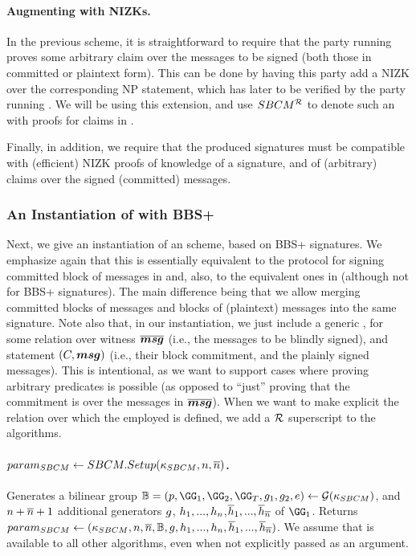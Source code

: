 \paragraph{Augmenting with NIZKs.} %
In the previous \SBCM scheme, it is straightforward to require that the party
running \SBCMCom proves some arbitrary claim over the messages to be signed
(both those in committed or plaintext form). This can be done by having this
party add a NIZK over the corresponding NP statement, which has later to be
verified by the party running \SBCMSign. We will be using this extension, and
use $SBCM^{\mathcal{R}}$ to denote such an \SBCM with proofs for claims in
\NIZKRel.

Finally, in addition, we require that the produced signatures must be compatible
with (efficient) NIZK proofs of knowledge of a signature, and of (arbitrary)
claims over the signed (committed) messages.

\subsubsection{An Instantiation of \SBCM with BBS+}

Next, we give an instantiation of an \SBCM scheme, based on BBS+ signatures.
We emphasize again that this is essentially equivalent to the protocol for
signing committed block of messages in \cite{asm06} and, also, to the equivalent
ones in \cite{cl02,ps16} (although not for BBS+ signatures). The main difference
being that we allow merging committed blocks of messages and blocks of
(plaintext) messages into the same signature.
%
Note also that, in our instantiation, we just include a generic \NIZK, for some
relation over witness $\overline{\boldsymbol{msg}}$ (i.e., the messages to be blindly
signed), and statement $(C,\boldsymbol{msg})$ (i.e., their block commitment, and the
plainly signed messages). This is intentional, as we want to support cases where
proving arbitrary predicates is possible (as opposed to ``just'' proving that
the commitment is over the messages in $\overline{\boldsymbol{msg}}$).
%
When we want to make explicit the relation over which the employed \NIZK is
defined, we add a $\mathcal{R}$ superscript to the algorithms.

\paragraph{$param_{SBCM} \gets SBCM.Setup(\kappa_{SBCM},n,\overline{n})$.} %
Generates a bilinear group $\BB = (p,\GG_1,\GG_2,\GG_T,\gen{g}_1,\gen{g}_2,e)
\gets \PGen(\SBCMsecpar)$, and $n+\overline{n}+1$ additional generators
$g$, $h_1,...,h_{n}$,$\overline{h}_1,...,\overline{h}_{\overline{n}}$
of $\GG_1$. Returns $param_{SBCM} \gets (\kappa_{SBCM},n,\overline{n},\mathbb{B},
g,h_1,...,h_{n},\overline{h}_1,...,\overline{h}_{\overline{n}})$.
We assume that \SBCMparm is available to all other algorithms, even when not
explicitly passed as an argument.


